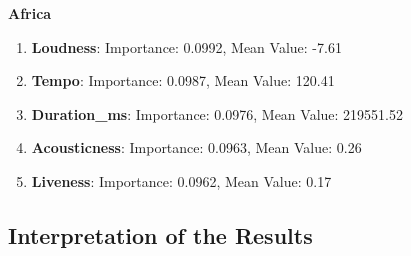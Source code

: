 \textbf{Africa}
\begin{enumerate}
    \item \textbf{Loudness}: Importance: 0.0992, Mean Value: -7.61
    \item \textbf{Tempo}: Importance: 0.0987, Mean Value: 120.41
    \item \textbf{Duration\_ms}: Importance: 0.0976, Mean Value: 219551.52
    \item \textbf{Acousticness}: Importance: 0.0963, Mean Value: 0.26
    \item \textbf{Liveness}: Importance: 0.0962, Mean Value: 0.17
\end{enumerate}

\newpage
\subsection{Interpretation of the Results}
